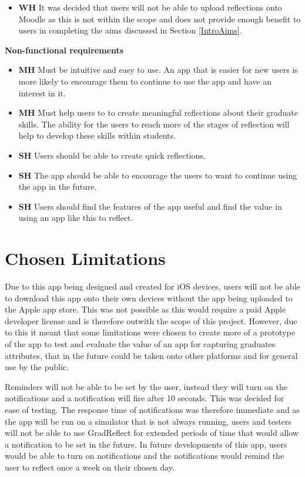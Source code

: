 \documentclass{l4proj}
\begin{document}
\begin{itemize}
    \item \textbf{WH} It was decided that users will not be able to upload reflections onto Moodle as this is not within the scope and does not provide enough benefit to users in completing the aims discussed in Section \ref{IntroAims}.
\end{itemize}

\textbf{Non-functional requirements}
\begin{itemize}
    \item \textbf{MH} Must be intuitive and easy to use. An app that is easier for new users is more likely to encourage them to continue to use the app and have an interest in it.
    \item \textbf{MH} Must help users to to create meaningful reflections about their graduate skills. The ability for the users to reach more of the stages of reflection will help to develop these skills within students.
    \item \textbf{SH} Users should be able to create quick reflections.
    \item \textbf{SH} The app should be able to encourage the users to want to continue using the app in the future.
    \item \textbf{SH} Users should find the features of the app useful and find the value in using an app like this to reflect. 
\end{itemize}


\section{Chosen Limitations}

Due to this app being designed and created for iOS devices, users will not be able to download this app onto their own devices without the app being uploaded to the Apple app store. This was not possible as this would require a paid Apple developer license and is therefore outwith the scope of this project. However, due to this it meant that some limitations were chosen to create more of a prototype of the app to test and evaluate the value of an app for capturing graduates attributes, that in the future could be taken onto other platforms and for general use by the public.

Reminders will not be able to be set by the user, instead they will turn on the notifications and a notification will fire after 10 seconds. This was decided for ease of testing. The response time of notifications was therefore immediate and as the app will be run on a simulator that is not always running, users and testers will not be able to use GradReflect for extended periods of time that would allow a notification to be set in the future. In future developments of this app, users would be able to turn on notifications and the notifications would remind the user to reflect once a week on their chosen day. 
\end{document}
